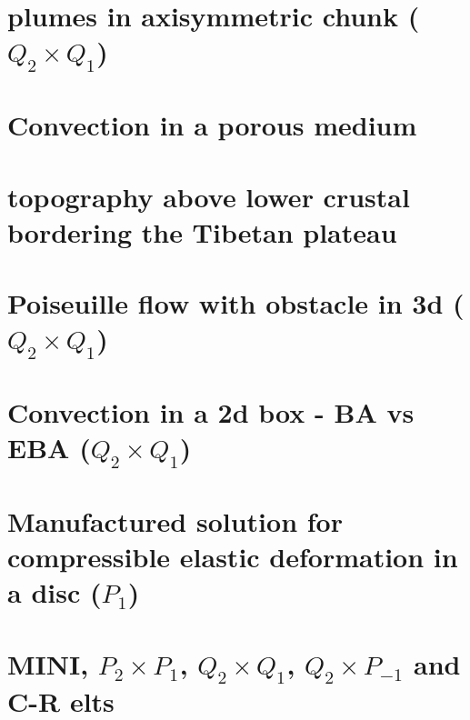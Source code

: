 \documentclass[a4paper,11pt]{report}
\begin{document}
\chapter{plumes in axisymmetric chunk ($Q_2\times Q_1$)  \label{f106}} %

\chapter{Convection in a porous medium  \label{f107}} %

\chapter{topography above lower crustal bordering the Tibetan plateau \label{f108}} %

\chapter{Poiseuille flow with obstacle in 3d ($Q_2\times Q_1$) \label{f109}} %

\chapter{Convection in a 2d box - BA vs EBA ($Q_2\times Q_1$) \label{f110}} %

\chapter{Manufactured solution for compressible elastic deformation in a disc ($P_1$)\label{f111}} %

\chapter{MINI, $P_2\times P_1$,  $Q_2\times Q_1$, $Q_2\times P_{-1}$ and C-R elts\label{f112}} %
\end{document}
